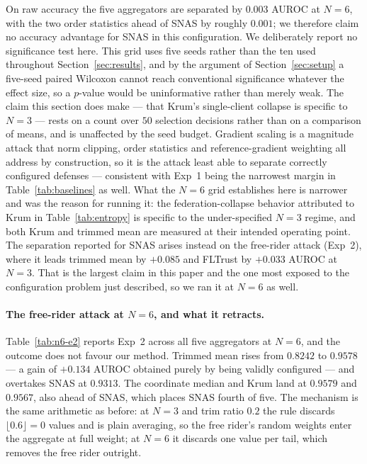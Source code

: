 \documentclass[pdflatex,sn-mathphys-num]{sn-jnl}
\begin{document}
On raw accuracy the five aggregators are separated by $0.003$ AUROC at $N=6$, with the two order statistics ahead of SNAS by roughly $0.001$; we therefore claim no accuracy advantage for SNAS in this configuration. We deliberately report no significance test here. This grid uses five seeds rather than the ten used throughout Section~\ref{sec:results}, and by the argument of Section~\ref{sec:setup} a five-seed paired Wilcoxon cannot reach conventional significance whatever the effect size, so a $p$-value would be uninformative rather than merely weak. The claim this section does make --- that Krum's single-client collapse is specific to $N=3$ --- rests on a count over $50$ selection decisions rather than on a comparison of means, and is unaffected by the seed budget. Gradient scaling is a magnitude attack that norm clipping, order statistics and reference-gradient weighting all address by construction, so it is the attack least able to separate correctly configured defenses --- consistent with Exp~1 being the narrowest margin in Table~\ref{tab:baselines} as well. What the $N=6$ grid establishes here is narrower and was the reason for running it: the federation-collapse behavior attributed to Krum in Table~\ref{tab:entropy} is specific to the under-specified $N=3$ regime, and both Krum and trimmed mean are measured at their intended operating point. The separation reported for SNAS arises instead on the free-rider attack (Exp~2), where it leads trimmed mean by $+0.085$ and FLTrust by $+0.033$ AUROC at $N=3$. That is the largest claim in this paper and the one most exposed to the configuration problem just described, so we ran it at $N=6$ as well.

\paragraph{The free-rider attack at $N=6$, and what it retracts.} Table~\ref{tab:n6-e2} reports Exp~2 across all five aggregators at $N=6$, and the outcome does not favour our method. Trimmed mean rises from $0.8242$ to $0.9578$ --- a gain of $+0.134$ AUROC obtained purely by being validly configured --- and overtakes SNAS at $0.9313$. The coordinate median and Krum land at $0.9579$ and $0.9567$, also ahead of SNAS, which places SNAS fourth of five. The mechanism is the same arithmetic as before: at $N=3$ and trim ratio $0.2$ the rule discards $\lfloor0.6\rfloor=0$ values and is plain averaging, so the free rider's random weights enter the aggregate at full weight; at $N=6$ it discards one value per tail, which removes the free rider outright.
\end{document}
